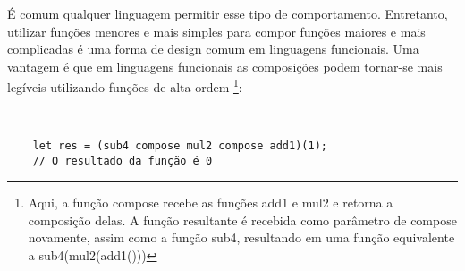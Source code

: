 É comum qualquer linguagem permitir esse tipo 
de comportamento. Entretanto, 
utilizar funções menores e mais simples para compor 
funções maiores e mais complicadas é uma forma de 
design comum em linguagens funcionais. Uma vantagem é 
que em linguagens funcionais as composições podem 
tornar-se mais legíveis utilizando funções 
de alta ordem \footnote{Aqui, a função compose 
recebe as funções add1 e mul2 e retorna a 
composição delas. A função resultante 
é recebida como parâmetro de compose novamente, 
assim como a função sub4, resultando em uma função 
equivalente a sub4(mul2(add1()))}:

\begin{lstlisting}[caption={Exemplo de Composição de Funções},label=hofogex]


    let res = (sub4 compose mul2 compose add1)(1);
    // O resultado da função é 0

\end{lstlisting}
